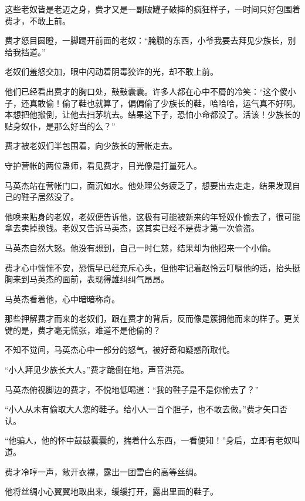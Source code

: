 
\begin{this_body}



这些老奴皆是老迈之身，费才又是一副破罐子破摔的疯狂样子，一时间只好包围着费才，不敢上前。

费才怒目圆瞪，一脚踢开前面的老奴：“腌臜的东西，小爷我要去拜见少族长，别给我挡道。”

老奴们羞怒交加，眼中闪动着阴毒狡诈的光，却不敢上前。

他们已经看出费才的胸口处，鼓鼓囊囊。许多人都在心中不屑的冷笑：“这个傻小子，还真敢偷！偷了鞋也就算了，偏偏偷了少族长的鞋，哈哈哈，运气真不好啊。本想把他搬倒，让他去扫茅坑去。结果这下子，恐怕小命都没了。活该！少族长的贴身奴仆，是那么好当的么？”

费才被老奴们半包围着，向少族长的营帐走去。

守护营帐的两位蛊师，看见费才，目光像是打量死人。

马英杰站在营帐门口，面沉如水。他处理公务疲乏了，想要出去走走，结果发现自己的鞋子居然没了。

他唤来贴身的老奴，老奴便告诉他，这极有可能被新来的年轻奴仆偷去了，很可能拿去卖掉换钱。老奴又告诉马英杰，这其实已经不是费才第一次偷盗。

马英杰自然大怒。他没有想到，自己一时仁慈，结果却为他招来一个小偷。

费才心中惴惴不安，恐慌早已经充斥心头，但他牢记着赵怜云叮嘱他的话，抬头挺胸来到马英杰的面前，表现得雄纠纠气昂昂。

马英杰看着他，心中暗暗称奇。

那些押解费才而来的老奴们，跟在费才的背后，反而像是簇拥他而来的样子。更关键的是，费才毫无慌张，难道不是他偷的？

不知不觉间，马英杰心中一部分的怒气，被好奇和疑惑所取代。

“小人拜见少族长大人。”费才跪倒在地，声音洪亮。

马英杰俯视脚边的费才，不悦地低喝道：“我的鞋子是不是你偷去了？”

“小人从未有偷取大人您的鞋子。给小人一百个胆子，也不敢去做。”费才矢口否认。

“他骗人，他的怀中鼓鼓囊囊的，揣着什么东西，一看便知！”身后，立即有老奴叫道。

费才冷哼一声，敞开衣襟，露出一团雪白的高等丝绸。

他将丝绸小心翼翼地取出来，缓缓打开，露出里面的鞋子。


\end{this_body}
